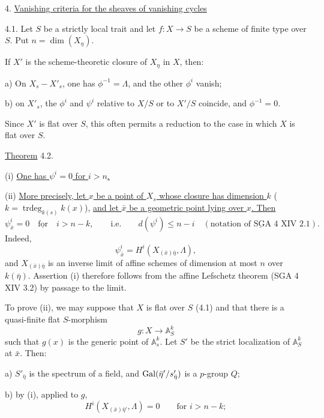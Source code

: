 
4. \underline{Vanishing criteria for the sheaves of vanishing cycles}

4.1. Let $S$ be a strictly local trait and let
$f:X\longrightarrow S$ be a scheme of finite type over $S$. Put
$n=\dim(X_\eta)$.

If $X'$ is the scheme-theoretic closure of $X_\eta$ in $X$, then:

a) On $X_s-X'_s$, one has $\phi^{-1}=\Lambda$, and the other
$\phi^i$ vanish;


b) on $X'_s$, the $\phi^i$ and $\psi^i$ relative to $X/S$ or to
$X'/S$ coincide, and $\phi^{-1}=0$.

Since $X'$ is flat over $S$, this often permits a reduction to the case
in which $X$ is flat over $S$.

\underline{Theorem} 4.2.

(i) \underline{One has $\psi^i=0$ for $i>n$.}

(ii) \underline{More precisely, let $x$ be a point of $X_s$ whose
closure has dimension $k$}
($k=\operatorname{trdeg}_{k(s)}k(x)$),
\underline{and let $\bar x$ be a geometric point lying over $x$. Then}
\begin{equation*}
\psi^i_{\bar x}=0
\quad\underline{\text{for}}\quad i>n-k,
\qquad\text{i.e.}\qquad
d(\psi^i)\leqslant n-i
\quad(\underline{\text{notation of SGA 4 XIV 2.1}}).
\end{equation*}
Indeed,
\[
\psi^i_{\bar x}=H^i(X_{(\bar x)\bar\eta},\Lambda),
\]
and $X_{(\bar x)\bar\eta}$ is an inverse limit of affine schemes of
dimension at most $n$ over $k(\bar\eta)$. Assertion (i) therefore follows
from the affine Lefschetz theorem (SGA 4 XIV 3.2) by passage to the
limit.

To prove (ii), we may suppose that $X$ is flat over $S$ (4.1) and that
there is a quasi-finite flat $S$-morphism
\[
g:X\longrightarrow\mathbb A^k_S
\]
such that $g(x)$ is the generic point of $\mathbb A^k_s$. Let $S'$ be
the strict localization of $\mathbb A^k_S$ at $\bar x$. Then:

a) $S'_{\bar\eta}$ is the spectrum of a field, and
$\operatorname{Gal}(\bar\eta'/s'_{\bar\eta})$ is a $p$-group $Q$;

b) by (i), applied to $g$,
\[
H^i(X_{(\bar x)\bar\eta'},\Lambda)=0
\qquad\text{for }i>n-k;
\]


